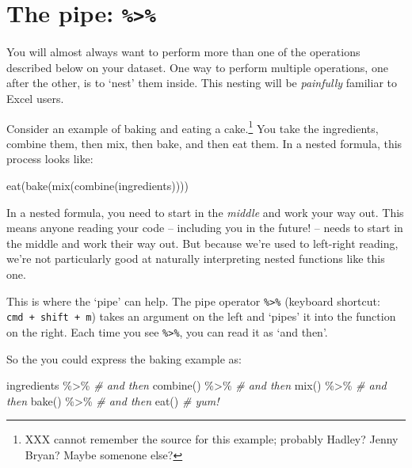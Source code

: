 \documentclass[
]{book}
\newenvironment{Shaded}{\begin{snugshade}}{\end{snugshade}}
\newcommand{\CommentTok}[1]{\textcolor[rgb]{0.56,0.35,0.01}{\textit{#1}}}
\newcommand{\FunctionTok}[1]{\textcolor[rgb]{0.00,0.00,0.00}{#1}}
\newcommand{\NormalTok}[1]{#1}
\newcommand{\SpecialCharTok}[1]{\textcolor[rgb]{0.00,0.00,0.00}{#1}}
\begin{document}
\hypertarget{the-pipe}{%
\section{\texorpdfstring{The pipe: \texttt{\%\textgreater{}\%}}{The pipe: \%\textgreater\%}}\label{the-pipe}}

You will almost always want to perform more than one of the operations described below on your dataset. One way to perform multiple operations, one after the other, is to `nest' them inside. This nesting will be \emph{painfully} familiar to Excel users.

Consider an example of baking and eating a cake.\footnote{XXX cannot remember the source for this example; probably Hadley? Jenny Bryan? Maybe somenone else?} You take the ingredients, combine them, then mix, then bake, and then eat them. In a nested formula, this process looks like:

\begin{Shaded}
\begin{Highlighting}[]
\FunctionTok{eat}\NormalTok{(}\FunctionTok{bake}\NormalTok{(}\FunctionTok{mix}\NormalTok{(}\FunctionTok{combine}\NormalTok{(ingredients))))}
\end{Highlighting}
\end{Shaded}

In a nested formula, you need to start in the \emph{middle} and work your way out. This means anyone reading your code -- including you in the future! -- needs to start in the middle and work their way out. But because we're used to left-right reading, we're not particularly good at naturally interpreting nested functions like this one.

This is where the `pipe' can help. The pipe operator \texttt{\%\textgreater{}\%} (keyboard shortcut: \texttt{cmd\ +\ shift\ +\ m}) takes an argument on the left and `pipes' it into the function on the right. Each time you see \texttt{\%\textgreater{}\%}, you can read it as `and then'.

So the you could express the baking example as:

\begin{Shaded}
\begin{Highlighting}[]
\NormalTok{ingredients }\SpecialCharTok{\%\textgreater{}\%} \CommentTok{\# and then}
  \FunctionTok{combine}\NormalTok{() }\SpecialCharTok{\%\textgreater{}\%} \CommentTok{\# and then}
  \FunctionTok{mix}\NormalTok{() }\SpecialCharTok{\%\textgreater{}\%} \CommentTok{\# and then}
  \FunctionTok{bake}\NormalTok{() }\SpecialCharTok{\%\textgreater{}\%} \CommentTok{\# and then}
  \FunctionTok{eat}\NormalTok{() }\CommentTok{\# yum!}
\end{Highlighting}
\end{Shaded}
\end{document}
